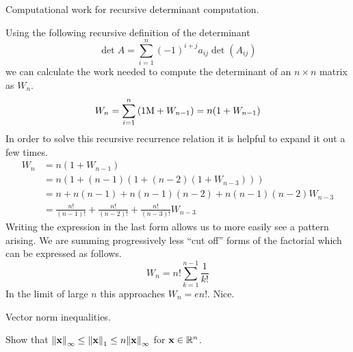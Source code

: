 \documentclass[boxes,pages]{homework}
\begin{document}
\begin{problem}
Computational work for recursive determinant computation.
\end{problem}

\begin{solution}
	Using the following recursive definition of the determinant
	\begin{equation*}
		\det A = \sum_{i = 1}^n (-1)^{i + j}a_{ij}\det(A_{ij})
	\end{equation*}
	we can calculate the work needed to compute the determinant of an $n\times n$ matrix as $W_n$.
	\begin{equation*}
		W_n = \sum_{i = 1}^n\qty(1\mathrm{M} + W_{n - 1}) = n\qty(1 + W_{n - 1})
	\end{equation*}
	In order to solve this recursive recurrence relation it is helpful to expand it out a few times.
	\begin{align*}
		W_n & = n(1 + W_{n - 1})                                                         \\
		    & = n(1 + (n - 1)(1 + (n - 2)(1 + W_{n - 3})))                               \\
		    & = n + n(n - 1) + n(n - 1)(n - 2) + n(n-1)(n - 2)W_{n - 3}                  \\
		    & = \frac{n!}{(n - 1)!} + \frac{n!}{(n - 2)!} + \frac{n!}{(n - 3)!}W_{n - 3}
	\end{align*}
	Writing the expression in the last form allows us to more easily see a pattern arising. We are summing progressively less ``cut off'' forms of the factorial which can be expressed as follows.
	\begin{equation*}
		W_n = n!\sum_{k = 1}^{n - 1}\frac{1}{k!}
	\end{equation*}
	In the limit of large $n$ this approaches $W_n = en!$. Nice.
\end{solution}

\begin{problem}
Vector norm inequalities.

Show that $\norm{\vb{x}}_\infty \leq\norm{\vb{x}}_1 \leq n\norm{\vb{x}}_\infty$ for $\vb{x}\in\mathbb{R}^n$.
\end{problem}
\end{document}
